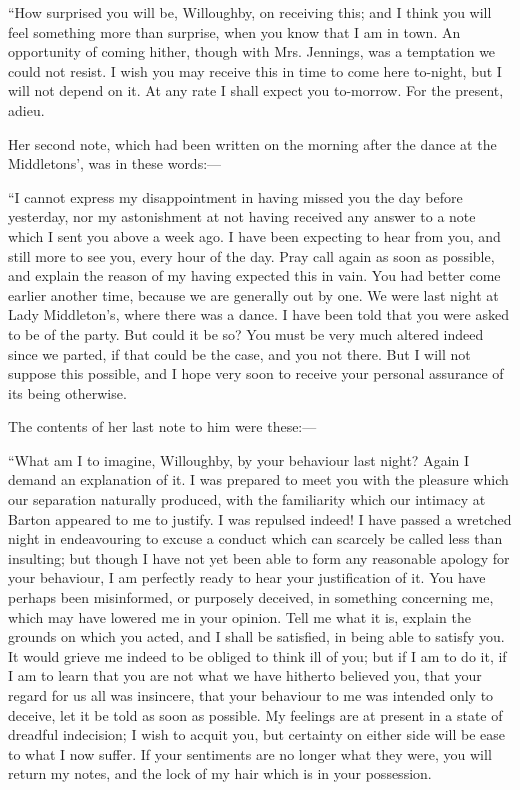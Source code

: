 “How surprised you will be, Willoughby, on receiving this; and I think you will feel something more than surprise, when you know that I am in town. An opportunity of coming hither, though with Mrs. Jennings, was a temptation we could not resist. I wish you may receive this in time to come here to-night, but I will not depend on it. At any rate I shall expect you to-morrow. For the present, adieu.


Her second note, which had been written on the morning after the dance at the Middletons', was in these words:---

“I cannot express my disappointment in having missed you the day before yesterday, nor my astonishment at not having received any answer to a note which I sent you above a week ago. I have been expecting to hear from you, and still more to see you, every hour of the day. Pray call again as soon as possible, and explain the reason of my having expected this in vain. You had better come earlier another time, because we are generally out by one. We were last night at Lady Middleton's, where there was a dance. I have been told that you were asked to be of the party. But could it be so? You must be very much altered indeed since we parted, if that could be the case, and you not there. But I will not suppose this possible, and I hope very soon to receive your personal assurance of its being otherwise.


The contents of her last note to him were these:---

“What am I to imagine, Willoughby, by your behaviour last night? Again I demand an explanation of it. I was prepared to meet you with the pleasure which our separation naturally produced, with the familiarity which our intimacy at Barton appeared to me to justify. I was repulsed indeed! I have passed a wretched night in endeavouring to excuse a conduct which can scarcely be called less than insulting; but though I have not yet been able to form any reasonable apology for your behaviour, I am perfectly ready to hear your justification of it. You have perhaps been misinformed, or purposely deceived, in something concerning me, which may have lowered me in your opinion. Tell me what it is, explain the grounds on which you acted, and I shall be satisfied, in being able to satisfy you. It would grieve me indeed to be obliged to think ill of you; but if I am to do it, if I am to learn that you are not what we have hitherto believed you, that your regard for us all was insincere, that your behaviour to me was intended only to deceive, let it be told as soon as possible. My feelings are at present in a state of dreadful indecision; I wish to acquit you, but certainty on either side will be ease to what I now suffer. If your sentiments are no longer what they were, you will return my notes, and the lock of my hair which is in your possession.

